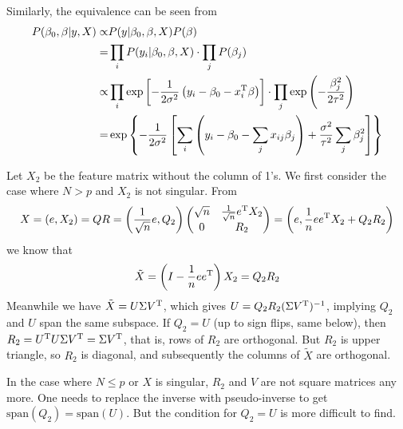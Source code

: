 \begin{sol}
Similarly, the equivalence can be seen from
\begin{align*}
P(\beta_0,\beta\vert y,X) \propto & P(y\vert\beta_0,\beta,X)P(\beta)\\
=& \prod_i P(y_i\vert\beta_0,\beta,X)\cdot\prod_j P(\beta_j)\\
\propto& \prod_i \exp\left[-\frac{1}{2\sigma^2}\left(y_i-\beta_0-x_i^{\mathrm{T}}\beta\right)\right] \cdot \prod_j \exp\left(-\frac{\beta_j^2}{2\tau^2}\right)\\
=& \exp\left\{-\frac{1}{2\sigma^2}\left[\sum_i \left(y_i-\beta_0-\sum_jx_{ij}\beta_j\right)+\frac{\sigma^2}{\tau^2}\sum_j \beta_j^2\right]\right\}
\end{align*}
\end{sol}

\begin{sol}
Let $X_2$ be the feature matrix without the column of 1's. We first consider the case where $N>p$ and $X_2$ is not singular. 
From
\[
X=(e,X_2)=QR=\left(\frac{1}{\sqrt{n}}e,Q_2\right)
\begin{pmatrix}
\sqrt{n} & \frac{1}{\sqrt{n}}e^{\mathrm{T}}X_2 \\
0 & R_2
\end{pmatrix}
=\left(e,\frac{1}{n}ee^{\mathrm{T}}X_2+Q_2R_2\right)
\]
we know that 
\[
\tilde{X}=\left(I-\frac{1}{n}ee^{\mathrm{T}}\right)X_2=Q_2R_2
\]
Meanwhile we have $\tilde{X}=U\Sigma V^{\mathrm{T}}$, which gives $U=Q_2R_2(\Sigma V^{\mathrm{T}})^{-1}$, implying $Q_2$ and $U$ span the same subspace. If $Q_2=U$ (up to sign flips, same below), then $R_2=U^{\mathrm{T}}U\Sigma V^{\mathrm{T}}=\Sigma V^{\mathrm{T}}$, that is, rows of $R_2$ are orthogonal. But $R_2$ is upper triangle, so $R_2$ is diagonal, and subsequently the columns of $\tilde{X}$ are orthogonal.

In the case where $N\le p$ or $X$ is singular, $R_2$ and $V$ are not square matrices any more. One needs to replace the inverse with pseudo-inverse to get $\mathrm{span}(Q_2)=\mathrm{span}(U)$. But the condition for $Q_2=U$ is more difficult to find.
\end{sol}

